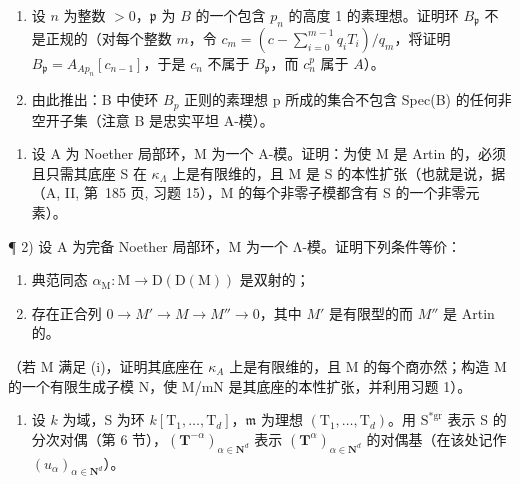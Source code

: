 \begin{enumerate}
\def\labelenumi{\alph{enumi})}
\item
  设 \(n\) 为整数 \(> 0\)，\(\mathfrak{p}\) 为 \(B\) 的一个包含 \(p_n\) 的高度 1 的素理想。证明环 \(B_{\mathfrak{p}}\) 不是正规的（对每个整数 \(m\)，令 \(c_m = (c - \sum_{i=0}^{m-1} q_i T_i)/q_m\)，将证明 \(B_{\mathfrak{p}} = A_{A p_n}[c_{n-1}]\)，于是 \(c_n\) 不属于 \(B_{\mathfrak{p}}\)，而 \(c_n^p\) 属于 \(A\)）。
\item
  由此推出：B 中使环 \(B_{p}\) 正则的素理想 p 所成的集合不包含 Spec(B) 的任何非空开子集（注意 B 是忠实平坦 A-模）。
\end{enumerate}


\begin{enumerate}
\def\labelenumi{\arabic{enumi})}
\tightlist
\item
  设 A 为 Noether 局部环，M 为一个 A-模。证明：为使 M 是 Artin 的，必须且只需其底座 S 在 \(\kappa_{\Lambda}\) 上是有限维的，且 M 是 S 的本性扩张（也就是说，据（A, II, 第~185 页, 习题 15），M 的每个非零子模都含有 S 的一个非零元素）。
\end{enumerate}

¶ 2) 设 A 为完备 Noether 局部环，M 为一个 Λ-模。证明下列条件等价：

\begin{enumerate}
\def\labelenumi{(\roman{enumi})}
\item
  典范同态 \(\alpha_{\mathrm{M}}: \mathrm{M} \to \mathrm{D}(\mathrm{D}(\mathrm{M}))\) 是双射的；
\item
  存在正合列 \(0 \to M' \to M \to M'' \to 0\)，其中 \(M'\) 是有限型的而 \(M''\) 是 Artin 的。
\end{enumerate}

（若 M 满足 (i)，证明其底座在 \(\kappa_{A}\) 上是有限维的，且 M 的每个商亦然；构造 M 的一个有限生成子模 N，使 M/mN 是其底座的本性扩张，并利用习题 1）。

\begin{enumerate}
\def\labelenumi{\arabic{enumi})}
\setcounter{enumi}{2}
\tightlist
\item
  设 \(k\) 为域，S 为环 \(k[\mathrm{T}_{1},\ldots ,\mathrm{T}_{d}]\)，\(\mathfrak{m}\) 为理想 \((\mathrm{T}_1,\dots ,\mathrm{T}_d)\)。用 \(\mathrm{S^{*gr}}\) 表示 S 的分次对偶（第 6 节），\((\mathbf{T}^{-\alpha})_{\alpha \in \mathbf{N}^d}\) 表示 \((\mathbf{T}^{\alpha})_{\alpha \in \mathbf{N}^d}\) 的对偶基（在该处记作 \((u_{\alpha})_{\alpha \in \mathbf{N}^d}\)）。
\end{enumerate}

